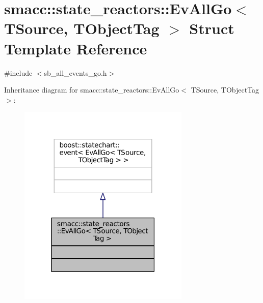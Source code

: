 \hypertarget{structsmacc_1_1state__reactors_1_1EvAllGo}{}\section{smacc\+:\+:state\+\_\+reactors\+:\+:Ev\+All\+Go$<$ T\+Source, T\+Object\+Tag $>$ Struct Template Reference}
\label{structsmacc_1_1state__reactors_1_1EvAllGo}


{\ttfamily \#include $<$sb\+\_\+all\+\_\+events\+\_\+go.\+h$>$}



Inheritance diagram for smacc\+:\+:state\+\_\+reactors\+:\+:Ev\+All\+Go$<$ T\+Source, T\+Object\+Tag $>$\+:
\nopagebreak
\begin{figure}[H]
\begin{center}
\leavevmode
\includegraphics[width=231pt]{structsmacc_1_1state__reactors_1_1EvAllGo__inherit__graph}
\end{center}
\end{figure}


